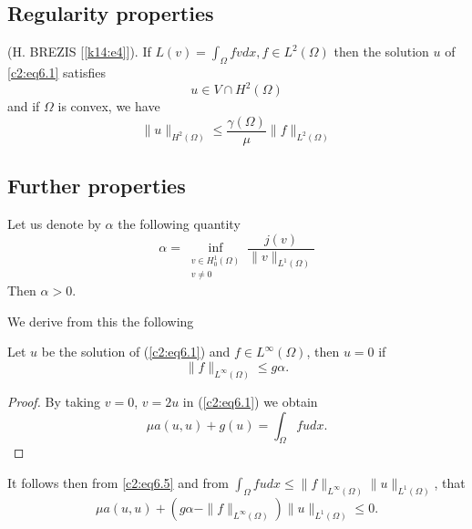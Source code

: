 \subsection{Regularity properties}\label{c2:ss6.3}

\begin{theorem}\label{c2:thm6.2}%
(H. BREZIS [\ref{k14:e4}]). If $L (v) = \int_\Omega fv dx, f \in L^2 (\Omega
  )$ then the solution $u$ of \eqref{c2:eq6.1} satisfies 
$$
u \in V \cap H^2 (\Omega )
$$
and if $\Omega$ is convex, we have
\begin{equation}
\parallel  u \parallel_{H^2 (\Omega )} \leq \frac{\gamma (\Omega)}{\mu} \parallel  f \parallel_{L^2
  (\Omega )}\tag{6.4}\label{c2:eq6.4} 
\end{equation}

\subsection{Further properties}\label{c2:ss6.4} 

Let us denote by $\alpha$ the following quantity 
\begin{equation}
\alpha = \inf_{\substack{v \in H^1_0 (\Omega) \\ v \neq 0}}
\frac{j(v)}{\parallel v\parallel_{L^1 (\Omega)}}\tag{6.5}\label{c2:eq6.5} 
\end{equation}
Then $\alpha > 0$.
\end{theorem}
We derive from this the following 

\begin{proposition}\label{c2:prop6.1}%
Let $u$ be the solution of (\ref{c2:eq6.1}) and $f \in L^\infty (\Omega)$,
then $u = 0 $ if  
\begin{equation}
\parallel  f\parallel_{L^\infty (\Omega)} \leq g \alpha.\tag{6.6}\label{c2:eq6.6} 
\end{equation}
\end{proposition}

\begin{proof}
By taking $v = 0$, $v = 2u$ in (\ref{c2:eq6.1}) we obtain 
\begin{equation}
\mu a(u, u) + g(u) = \int_\Omega fu dx. \tag{6.7}\label{c2:eq6.7} 
\end{equation}
\end{proof}

It follows then from \eqref{c2:eq6.5} and from $\int_\Omega fu dx \leq
\parallel  f 
\parallel_{L^\infty (\Omega)} \parallel  u \parallel_{L^1 (\Omega )}$, that  
\begin{equation}
\mu a( u, u) + (g \alpha - \parallel  f\parallel_{L^\infty (\Omega )}) \parallel  u \parallel_{L^1
  (\Omega)} \leq 0.\tag{6.8}\label{c2:eq6.8} 
\end{equation}

